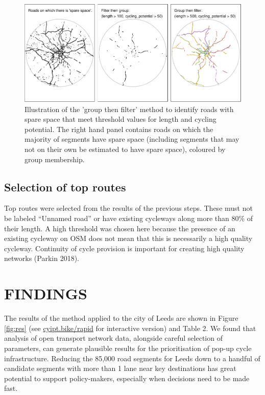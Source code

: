 \documentclass[
]{article}
\begin{document}
\begin{figure}
\includegraphics[width=1\linewidth]{article_files/figure-latex/levels-1} \caption{Illustration of the 'group then filter' method to identify roads with spare space that meet threshold values for length and cycling potential. The right hand panel contains roads on which the majority of segments have spare space (including segments that may not on their own be estimated to have spare space), coloured by group membership.}\label{fig:levels}
\end{figure}

\hypertarget{selection-of-top-routes}{%
\subsection{Selection of top routes}\label{selection-of-top-routes}}

Top routes were selected from the results of the previous steps.
These must not be labeled ``Unnamed road'' or have existing cycleways along more than 80\% of their length.
A high threshold was chosen here because the presence of an existing cycleway on OSM does not mean that this is necessarily a high quality cycleway.
Continuity of cycle provision is important for creating high quality networks (Parkin 2018).

\hypertarget{findings}{%
\section{FINDINGS}\label{findings}}

The results of the method applied to the city of Leeds are shown in Figure \ref{fig:res} (see \href{https://www.cyipt.bike/rapid/west-yorkshire/}{cyipt.bike/rapid} for interactive version) and Table 2.
We found that analysis of open transport network data, alongside careful selection of parameters, can generate plausible results for the prioritisation of pop-up cycle infrastructure.
Reducing the 85,000 road segments for Leeds down to a handful of candidate segments with more than 1 lane near key destinations has great potential to support policy-makers, especially when decisions need to be made fast.
\end{document}
